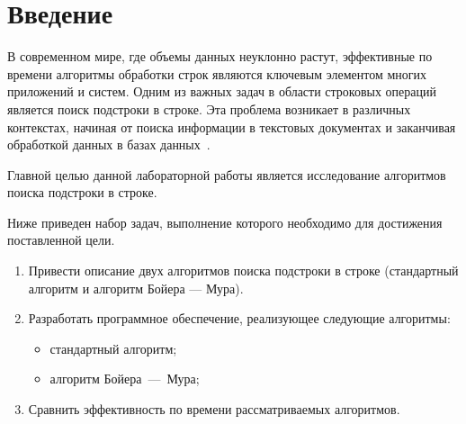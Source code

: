 \chapter*{Введение}

В современном мире, где объемы данных неуклонно растут, эффективные по времени алгоритмы обработки строк являются ключевым элементом многих приложений и систем. 
Одним из важных задач в области строковых операций является поиск подстроки в строке. 
Эта проблема возникает в различных контекстах, начиная от поиска информации в текстовых документах и заканчивая обработкой данных в базах данных~\cite{intro}.

Главной целью данной лабораторной работы является исследование алгоритмов поиска подстроки в строке.

Ниже приведен набор задач, выполнение которого необходимо для достижения поставленной цели.
\begin{enumerate}[label={\arabic*)}]
\item Привести описание двух алгоритмов поиска подстроки в строке (стандартный алгоритм и алгоритм Бойера --- Мура).
\item Разработать программное обеспечение, реализующее следующие алгоритмы:
\begin{itemize}[label=---]
\item стандартный алгоритм;
\item алгоритм Бойера~---~Мура;
\end{itemize}
\item Сравнить эффективность по времени рассматриваемых алгоритмов.
\end{enumerate}